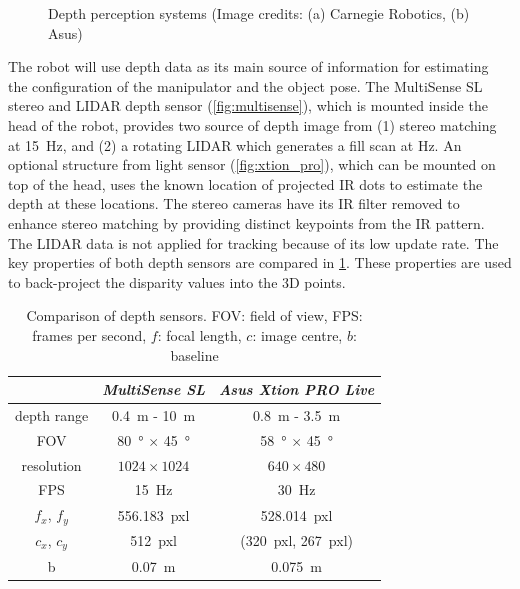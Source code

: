 \begin{figure}
\begin{minipage}{0.5\textwidth}
\caption{Depth perception systems (Image credits: (a) Carnegie Robotics, (b) Asus)}
\label{fig:depth_sensors}
\end{minipage}
\end{figure}

The robot will use depth data as its main source of information for estimating the configuration of the manipulator and the object pose. The MultiSense SL stereo and LIDAR depth sensor (\cref{fig:multisense}), which is mounted inside the head of the robot, provides two source of depth image from (1) stereo matching at \SI{15}{\hertz}, and (2) a rotating LIDAR which generates a fill scan at  \si{\hertz}. An optional structure from light sensor (\cref{fig:xtion_pro}), which can be mounted on top of the head, uses the known location of projected IR dots to estimate the depth at these locations. The stereo cameras have its IR filter removed to enhance stereo matching by providing distinct keypoints from the IR pattern. The LIDAR data is not applied for tracking because of its low update rate.
The key properties of both depth sensors are compared in \cref{tab:depth_sensor_comparison}. These properties are used to back-project the disparity values into the 3D points.

\begin{table}
\captionsetup{width=0.7\textwidth}
\centering
\begin{tabular}{|c||c|c|}
\hline
 & \textit{MultiSense SL} & \textit{Asus Xtion PRO Live} \\
\hline
\hline
depth range & \SI{0.4}{\meter} - \SI{10}{\meter} & \SI{0.8}{\meter} - \SI{3.5}{\meter} \\
\hline
FOV & \SI{80}{\degree} $\times$ \SI{45}{\degree} & \SI{58}{\degree} $\times$ \SI{45}{\degree} \\
\hline
resolution & $1024 \times 1024$ & $640 \times 480$ \\
\hline
FPS & \SI{15}{\hertz} & \SI{30}{\hertz} \\
\hline
$f_x$, $f_y$ & \SI{556.183}{pxl} & \SI{528.014}{pxl} \\
\hline
$c_x$, $c_y$ & \SI{512}{pxl} & (\SI{320}{pxl}, \SI{267}{pxl}) \\
\hline
b & \SI{0.07}{\meter} & \SI{0.075}{\meter} \\
\hline
\end{tabular}
\caption[Comparison of depth sensors]{Comparison of depth sensors. FOV: field of view, FPS: frames per second, $f$: focal length, $c$: image centre, $b$: baseline}
\label{tab:depth_sensor_comparison}
\end{table}


